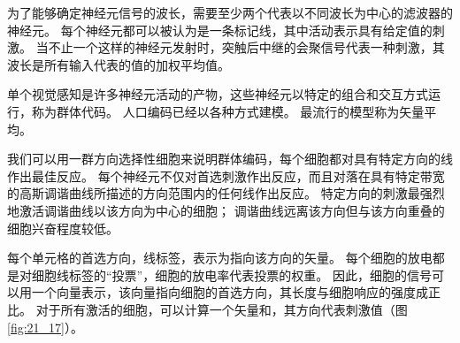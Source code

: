 为了能够确定神经元信号的波长，需要至少两个代表以不同波长为中心的滤波器的神经元。 
每个神经元都可以被认为是一条标记线，其中活动表示具有给定值的刺激。 
当不止一个这样的神经元发射时，突触后中继的会聚信号代表一种刺激，其波长是所有输入代表的值的加权平均值。


单个视觉感知是许多神经元活动的产物，这些神经元以特定的组合和交互方式运行，称为群体代码。 
人口编码已经以各种方式建模。 
最流行的模型称为矢量平均。


我们可以用一群方向选择性细胞来说明群体编码，每个细胞都对具有特定方向的线作出最佳反应。 
每个神经元不仅对首选刺激作出反应，而且对落在具有特定带宽的高斯调谐曲线所描述的方向范围内的任何线作出反应。 
特定方向的刺激最强烈地激活调谐曲线以该方向为中心的细胞； 
调谐曲线远离该方向但与该方向重叠的细胞兴奋程度较低。


每个单元格的首选方向，线标签，表示为指向该方向的矢量。 
每个细胞的放电都是对细胞线标签的“投票”，细胞的放电率代表投票的权重。 
因此，细胞的信号可以用一个向量表示，该向量指向细胞的首选方向，其长度与细胞响应的强度成正比。 
对于所有激活的细胞，可以计算一个矢量和，其方向代表刺激值（图 \ref{fig:21_17}）。

